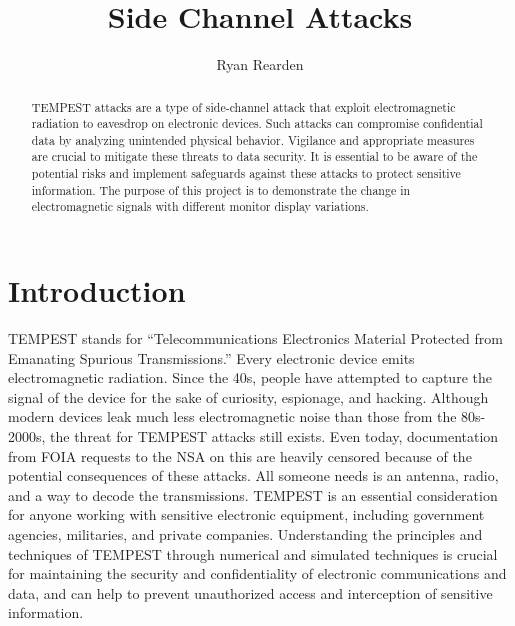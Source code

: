 \documentclass{article}
\title{Side Channel Attacks}
\author{Ryan Rearden}
\begin{document}
\maketitle

\begin{abstract}
TEMPEST attacks are a type of side-channel attack that exploit electromagnetic radiation to eavesdrop on electronic devices. Such attacks can compromise confidential data by analyzing unintended physical behavior. Vigilance and appropriate measures are crucial to mitigate these threats to data security. It is essential to be aware of the potential risks and implement safeguards against these attacks to protect sensitive information. The purpose of this project is to demonstrate the change in electromagnetic signals with different monitor display variations. 
\end{abstract}

\section{Introduction}
TEMPEST stands for “Telecommunications Electronics Material Protected from Emanating Spurious Transmissions.” Every electronic device emits electromagnetic radiation. Since the 40s, people have attempted to capture the signal of the device for the sake of curiosity, espionage, and hacking. Although modern devices leak much less electromagnetic noise than those from the 80s-2000s, the threat for TEMPEST attacks still exists. Even today, documentation from FOIA requests to the NSA on this are heavily censored because of the potential consequences of these attacks. All someone needs is an antenna, radio, and a way to decode the transmissions. TEMPEST is an essential consideration for anyone working with sensitive electronic equipment, including government agencies, militaries, and private companies. Understanding the principles and techniques of TEMPEST through numerical and simulated techniques is crucial for maintaining the security and confidentiality of electronic communications and data, and can help to prevent unauthorized access and interception of sensitive information.
\end{document}
